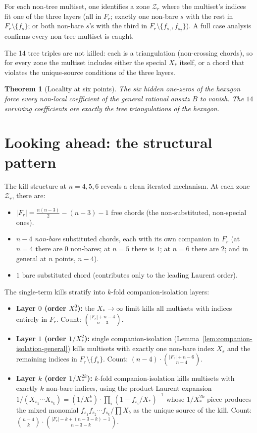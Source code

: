 \documentclass[11pt]{article}
\newcommand{\Z}{\mathcal{Z}}
\newtheorem{theorem}{Theorem}
\theoremstyle{definition}
\begin{document}
For each non-tree multiset, one identifies a zone $\Z_r$ where the
multiset's indices fit one of the three layers (all in $F_r$;
exactly one non-bare $s$ with the rest in $F_r\setminus\{f_s\}$; or both
non-bare $s$'s with the third in $F_r\setminus\{f_{s_1},f_{s_2}\}$).
A full case analysis confirms every non-tree multiset is caught.

The 14 tree triples are not killed: each is a triangulation (non-crossing
chords), so for every zone the multiset includes either the special $X_*$
itself, or a chord that violates the unique-source conditions of the
three layers.

\begin{theorem}[Locality at six points]
The six hidden one-zeros of the hexagon force every non-local coefficient
of the general rational ansatz $B$ to vanish. The $14$ surviving
coefficients are exactly the tree triangulations of the hexagon.
\end{theorem}

\section{Looking ahead: the structural pattern}

The kill structure at $n=4,5,6$ reveals a clean iterated mechanism.
At each zone $\Z_r$, there are:
\begin{itemize}[nosep,leftmargin=2em]
\item $|F_r|=\frac{n(n-3)}{2}-(n-3)-1$ free chords (the non-substituted,
non-special ones).
\item $n-4$ \emph{non-bare} substituted chords, each with its own companion
in $F_r$ (at $n=4$ there are $0$ non-bares; at $n=5$ there is $1$;
at $n=6$ there are $2$; and in general at $n$ points, $n-4$).
\item $1$ bare substituted chord (contributes only to the leading Laurent order).
\end{itemize}

The single-term kills stratify into $k$-fold companion-isolation layers:
\begin{itemize}[nosep,leftmargin=2em]
\item \textbf{Layer $0$ (order $X_*^0$):} the $X_*\to\infty$ limit kills
all multisets with indices entirely in $F_r$.
Count: $\binom{|F_r|+n-4}{n-3}$.
\item \textbf{Layer $1$ (order $1/X_*^2$):} single companion-isolation
(Lemma~\ref{lem:companion-isolation-general}) kills multisets with
exactly one non-bare index $X_s$ and the remaining indices in
$F_r\setminus\{f_s\}$. Count: $(n-4)\cdot\binom{|F_r|+n-6}{n-4}$.
\item \textbf{Layer $k$ (order $1/X_*^{2k}$):} $k$-fold companion-isolation
kills multisets with exactly $k$ non-bare indices, using the product
Laurent expansion
$1/(X_{s_1}\cdots X_{s_k}) = (1/X_*^k)\cdot\prod_i(1-f_{s_i}/X_*)^{-1}$
whose $1/X_*^{2k}$ piece produces the mixed monomial
$f_{s_1}f_{s_2}\cdots f_{s_k}/\prod X_b$ as the unique source of the kill.
Count: $\binom{n-4}{k}\cdot\binom{|F_r|-k+(n-3-k)-1}{n-3-k}$.
\end{itemize}
\end{document}

